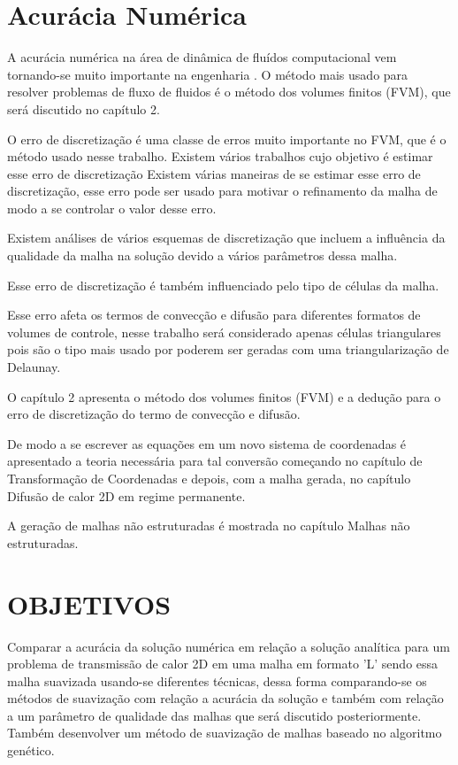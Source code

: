 \section{Acurácia Numérica}
A acurácia numérica na área de dinâmica de fluídos computacional vem tornando-se muito importante na engenharia \cite{doi:10.1080/10407791003685155}. O método mais usado para resolver problemas de fluxo de fluidos é o método dos volumes finitos (FVM), que será discutido no capítulo 2.

O erro de discretização é uma classe de erros muito importante no FVM, que é o método usado nesse trabalho. Existem vários trabalhos cujo objetivo é estimar esse erro de discretização \cite{Muzaferija2014} \cite{Jasak1996} Existem várias maneiras de se estimar esse erro de discretização, esse erro pode ser usado para motivar o refinamento da malha de modo a se controlar o valor desse erro.

Existem análises de vários esquemas de discretização que incluem a influência da qualidade da malha na solução devido a vários parâmetros dessa malha.

Esse erro de discretização é também influenciado pelo tipo de células da malha. \cite{doi:10.1080/10407791003685155}

Esse erro afeta os termos de convecção e difusão para diferentes formatos de volumes de controle, nesse trabalho será considerado apenas células triangulares pois são o tipo mais usado por poderem ser geradas com uma triangularização de Delaunay.

O capítulo 2 apresenta o método dos volumes finitos (FVM) e a dedução para o erro de discretização do termo de convecção e difusão.

De modo a se escrever as equações em um novo sistema de coordenadas é apresentado a teoria necessária para tal conversão começando no capítulo de Transformação de Coordenadas e depois, com a malha gerada, no capítulo Difusão de calor 2D em regime permanente.

A geração de malhas não estruturadas é mostrada no capítulo Malhas não estruturadas.

\section{OBJETIVOS}

Comparar a acurácia da solução numérica em relação a solução analítica para um problema de transmissão de calor 2D em uma malha em formato 'L' sendo essa malha suavizada usando-se diferentes técnicas, dessa forma comparando-se os métodos de suavização com relação a acurácia da solução e também com relação a um parâmetro de qualidade das malhas que será discutido posteriormente.
Também desenvolver um método de suavização de malhas baseado no algoritmo genético.

